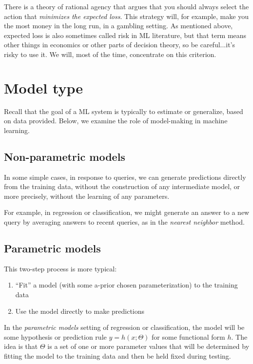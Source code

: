 There is a theory of rational agency that argues that you should
always select the action that {\em minimizes the expected loss}.  This
strategy will, for example, make you the most money in the long run,
in a gambling setting.    As mentioned above, expected loss is
also sometimes called risk in ML literature,
but that term means other things in economics or other parts of
decision theory, so be careful...it's risky to use it.  We will, most of the time, concentrate on this criterion.


\section{Model type}

Recall that the goal of a ML system is typically to
estimate or generalize, based on data provided.  Below, we examine the
role of model-making in machine learning.

\subsection{Non-parametric models}

In some simple cases, in response to queries, we can generate
predictions directly from the training data, without the construction
of any intermediate model, or more precisely, without the learning of any parameters. 

For example, in regression or classification, we might generate an answer to a new query by averaging answers to recent queries, as in the {\em nearest neighbor} method.


\subsection{Parametric models}

This two-step process is more typical:
\begin{enumerate}
  \item ``Fit'' a model (with some a-prior chosen parameterization) to the training data
  \item Use the model directly to make predictions
\end{enumerate}

In the {\em parametric models} setting of regression or classification, the
model will be some hypothesis or prediction rule $y = h(x ; \Theta)$
for some functional form $h$.  The idea is that $\Theta$ is a set
of one or more parameter values that will be determined by fitting the
model to the training data and then be held fixed during testing.  

